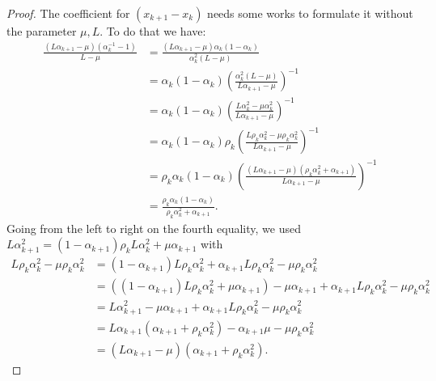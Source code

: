 \documentclass[12pt]{article}
\begin{document}
\begin{proof}
        The coefficient for $(x_{k + 1} - x_k)$ needs some works to formulate it without the parameter $\mu, L$. 
        To do that we have: 
        \begin{align*}
            \frac{(L\alpha_{k + 1} - \mu)(\alpha_k^{-1} - 1)}{L - \mu}
            &= \frac{(L\alpha_{k + 1} - \mu)\alpha_k(1 - \alpha_k)}{\alpha_k^2(L - \mu)}
            \\
            &= 
            \alpha_k(1 - \alpha_k)
            \left(
                \frac{\alpha_k^2(L - \mu)}{L\alpha_{k + 1} - \mu}
            \right)^{-1}
            \\
            &= \alpha_k(1 - \alpha_k)
            \left(
                \frac{L\alpha_k^2 - \mu\alpha_k^2}{L\alpha_{k + 1} - \mu}
            \right)^{-1}
            \\
            &= 
            \alpha_k(1 - \alpha_k)
            \rho_k\left(
                \frac{L\rho_k\alpha_k^2 - \mu\rho_k\alpha_k^2}{L\alpha_{k + 1} - \mu}
            \right)^{-1}
            \\
            &= 
            \rho_k\alpha_k(1 - \alpha_k)
            \left(
                \frac{(L\alpha_{k + 1} - \mu)(\rho_k\alpha_k^2 + \alpha_{k + 1})}
                {L\alpha_{k + 1} - \mu}
            \right)^{-1}
            \\
            &= \frac{\rho_k\alpha_k(1 - \alpha_k)}{\rho_k\alpha_k^2 + \alpha_{k + 1}}.
        \end{align*}
        Going from the left to right on the fourth equality, we used $L\alpha_{k + 1}^2 = (1 - \alpha_{k + 1})\rho_kL\alpha_k^2 + \mu \alpha_{k + 1}$ with 
        \begin{align*}
            L \rho_k \alpha_k^2 - \mu \rho_k \alpha_k^2 
            &= 
            (1 - \alpha_{k + 1})L \rho_k \alpha_k^2 + \alpha_{k + 1} L \rho_k \alpha_k^2 - \mu \rho_k \alpha_k^2
            \\
            &= 
            ((1 - \alpha_{k + 1})L \rho_k \alpha_k^2 + \mu \alpha_{k + 1}) - \mu\alpha_{k + 1} + \alpha_{k + 1} L \rho_k \alpha_k^2 - \mu \rho_k \alpha_k^2
            \\
            &= L \alpha_{k + 1}^2 - \mu\alpha_{k + 1} + \alpha_{k + 1}L\rho_k\alpha_k^2 - \mu \rho_k \alpha_k^2
            \\
            &= 
            L\alpha_{k + 1}(\alpha_{k + 1} + \rho_k \alpha_k^2) - \alpha_{k + 1}\mu - \mu \rho_k \alpha_k^2
            \\
            &= (L \alpha_{k + 1} - \mu)(\alpha_{k + 1} + \rho_k \alpha_k^2). 

\end{align*}
\end{proof}
\end{document}
